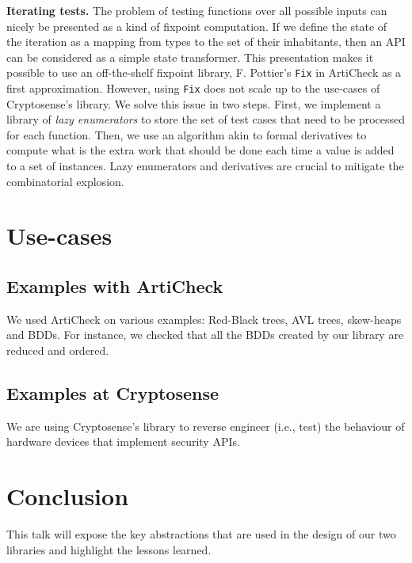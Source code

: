 \documentclass[twocolumn,9pt]{article}
\newcommand{\acheck}{ArtiCheck\xspace}
\newcommand{\code}[1]{\texttt{#1}}
\renewcommand\paragraph[1]{\newline\textbf{#1}}
\begin{document}
\paragraph{Iterating tests.} The problem of testing functions over all
possible inputs can nicely be presented as a kind of fixpoint
computation. If we define the state of the iteration as a mapping from
types to the set of their inhabitants, then an API can be considered
as a simple state transformer.
%
This presentation makes it possible to use an off-the-shelf fixpoint
library, F. Pottier's \code{Fix} in \acheck as a first
approximation.
%
However, using \code{Fix} does not scale up to the use-cases of
Cryptosense's library. We solve this issue in two steps. First, we
implement a library of \emph{lazy enumerators} to store the set of
test cases that need to be processed for each function. Then, we use
an algorithm akin to formal derivatives to compute what is the extra
work that should be done each time a value is added to a set of
instances. Lazy enumerators and derivatives are crucial to mitigate
the combinatorial explosion.

\section{Use-cases}
\subsection{Examples with \acheck}
We used \acheck on various examples: Red-Black trees, AVL trees,
skew-heaps and BDDs. For instance, we checked that all the BDDs
created by our library are reduced and ordered.
\subsection{Examples at Cryptosense}
We are using Cryptosense's library to reverse engineer (i.e., test)
the behaviour of hardware devices that implement security APIs.

\section{Conclusion}
This talk will expose the key abstractions that are used in the design
of our two libraries and highlight the lessons learned.


% 
% 
\end{document}
